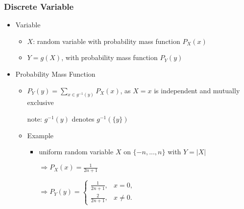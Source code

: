 \subsubsection{Discrete Variable}
\begin{itemize}
\item Variable
	\begin{itemize}
	\item $X$: random variable with probability mass function $P_X(x)$
	\item $Y = g(X)$, with probability mass function $P_Y(y)$
	\end{itemize}
\item Probability Mass Function
	\begin{itemize}
	\item $\displaystyle P_Y(y) = \sum_{x\in g^{-1}(y)} P_X(x)$, as $X=x$ is independent and mutually exclusive	
	
	note: $g^{-1}(y)$ denotes $g^{-1}(\{y\})$
	\item Example
		\begin{itemize}
		\item uniform random variable $X$ on $\{-n,...,n\}$ with $Y=|X|$
		
		$\Rightarrow P_X(x) = \frac 1 {2n+1}$
			
		$\Rightarrow P_Y(y) = \begin{cases} \frac 1 {2n+1}, &x=0, \\ \frac 2 {2n+1}, &x\neq0. \end{cases}$
		\end{itemize}
	\end{itemize}
\end{itemize}

